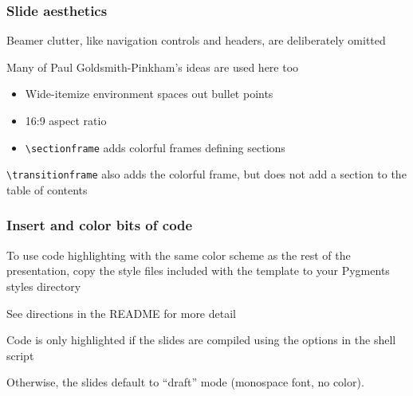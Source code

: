 \documentclass[aspectratio=169,handout]{beamer}
\begin{document}
	
	
\begin{frame}
	\frametitle{Slide aesthetics}
	\begin{witem}
		\item Beamer clutter, like navigation controls and headers, are deliberately omitted
		\item Many of Paul Goldsmith-Pinkham's ideas are used here too
			\begin{itemize}
				\item Wide-itemize environment spaces out bullet points
				\item 16:9 aspect ratio 
				\item \texttt{\textbackslash{}sectionframe} adds colorful frames defining sections
			\end{itemize}
			
			\href{https://github.com/paulgp/beamer-tips}{}
		\item \texttt{\textbackslash{}transitionframe} also adds the colorful frame, but does not add a section to the table of contents
	\end{witem}
\end{frame}









\begin{frame}
	\frametitle{Insert and color bits of code}
	\begin{witem}
		\item To use code highlighting with the same color scheme as
			the rest of the presentation, copy the style files included
			with the template to your Pygments styles directory
		\item See directions in the README for more detail
		\item Code is only highlighted if the slides are compiled using the
			options in the shell script
		\item Otherwise, the slides default to ``draft'' mode (monospace font,
			no color).
	\end{witem}
\end{frame}
\end{document}
